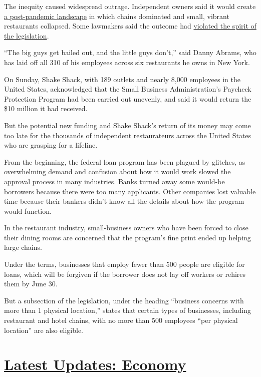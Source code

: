The inequity caused widespread outrage. Independent owners said it would
create
\href{https://www.esquire.com/food-drink/restaurants/a32190986/cares-act-chains-independent-restaurants/}{a
post-pandemic landscape} in which chains dominated and small, vibrant
restaurants collapsed. Some lawmakers said the outcome had
\href{https://www.wsj.com/articles/how-ruths-chris-got-an-extra-helping-of-small-business-aid-money-11587312001}{violated
the spirit of the legislation}.

``The big guys get bailed out, and the little guys don't,'' said Danny
Abrams, who has laid off all 310 of his employees across six restaurants
he owns in New York.

On Sunday, Shake Shack, with 189 outlets and nearly 8,000 employees in
the United States, acknowledged that the Small Business Administration's
Paycheck Protection Program had been carried out unevenly, and said it
would return the \$10 million it had received.

But the potential new funding and Shake Shack's return of its money may
come too late for the thousands of independent restaurateurs across the
United States who are grasping for a lifeline.

From the beginning, the federal loan program has been plagued by
glitches, as overwhelming demand and confusion about how it would work
slowed the approval process in many industries. Banks turned away some
would-be borrowers because there were too many applicants. Other
companies lost valuable time because their bankers didn't know all the
details about how the program would function.

In the restaurant industry, small-business owners who have been forced
to close their dining rooms are concerned that the program's fine print
ended up helping large chains.

Under the terms, businesses that employ fewer than 500 people are
eligible for loans, which will be forgiven if the borrower does not lay
off workers or rehires them by June 30.

But a subsection of the legislation, under the heading ``business
concerns with more than 1 physical location,'' states that certain types
of businesses, including restaurant and hotel chains, with no more than
500 employees ``per physical location'' are also eligible.

\hypertarget{latest-updates-economy}{%
\section{\texorpdfstring{\href{https://www.nytimes3xbfgragh.onion/live/2020/08/03/business/stock-market-today-coronavirus?action=click\&pgtype=Article\&state=default\&region=MAIN_CONTENT_1\&context=storylines_live_updates}{Latest
Updates:
Economy}}{Latest Updates: Economy}}\label{latest-updates-economy}}

